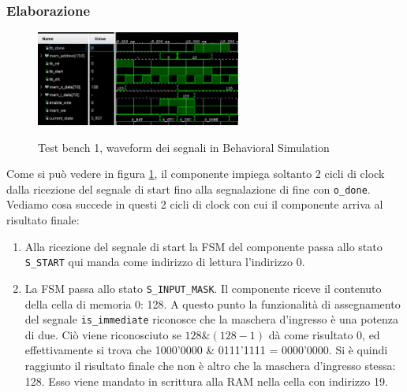 \documentclass{article}
\begin{document}
\subsubsection{Elaborazione}
\begin{figure}[H]
    \centering
    \caption{Test bench 1, waveform dei segnali in Behavioral Simulation}
    \includegraphics[width=0.6\textwidth]{images/test-bench-1.png}
    \label{fig:test-bench-1}
\end{figure}
Come si può vedere in figura \ref{fig:test-bench-1}, il componente impiega soltanto 2 cicli di clock dalla ricezione del segnale di start fino alla segnalazione di fine con \verb^o_done^.\\
Vediamo cosa succede in questi 2 cicli di clock con cui il componente arriva al risultato finale:
\renewcommand{\labelenumi}{\Roman{enumi}}
\begin{enumerate}
    \item Alla ricezione del segnale di start la FSM del componente passa allo stato \verb^S_START^ qui manda come indirizzo di lettura l'indirizzo 0.
    \item La FSM passa allo stato \verb^S_INPUT_MASK^. Il componente riceve il contenuto della cella di memoria 0: 128. A questo punto la funzionalità di assegnamento del segnale \verb^is_immediate^ riconosce che la maschera d'ingresso è una potenza di due. Ciò viene riconosciuto se \(128\&(128-1)\) dà come risultato 0, ed effettivamente si trova che 1000'0000 \& 0111'1111 = 0000'0000. Si è quindi raggiunto il risultato finale che non è altro che la maschera d'ingresso stessa: 128.  Esso viene mandato in scrittura alla RAM nella cella con indirizzo 19.
\end{enumerate}
\end{document}
